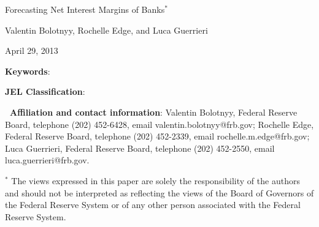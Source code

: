\documentclass[12pt]{article}
\renewcommand{\baselinestretch}{1.5}
\begin{document}
\bigskip

\bigskip

\clearpage

\renewcommand{\baselinestretch}{1.0}

\begin{center}
{\normalsize \thispagestyle{empty} }

{\normalsize \medskip }

{\normalsize {\Large Forecasting Net Interest Margins of Banks$^{*}$}
\medskip }

{\normalsize \bigskip \bigskip }

{\normalsize Valentin Bolotnyy, Rochelle Edge, and Luca Guerrieri }

{\normalsize \bigskip \bigskip }

{\normalsize April 29, 2013 }

{\normalsize \bigskip }
\end{center}

{\normalsize \bigskip }

\abstract{}

{\normalsize \vspace{3.0cm} }

{\normalsize \noindent \textbf{Keywords}: \vspace{1cm} }

{\normalsize \noindent \textbf{JEL Classification}: }

{\normalsize \vspace{2cm} }

\renewcommand{\baselinestretch}{1} {\footnotesize \noindent }

{\footnotesize \textbf{\ Affiliation and contact information}: Valentin
Bolotnyy, Federal Reserve Board, telephone (202) 452-6428, email
valentin.bolotnyy@frb.gov; Rochelle Edge, Federal Reserve Board, telephone
(202) 452-2339, email rochelle.m.edge@frb.gov; Luca Guerrieri, Federal
Reserve Board, telephone (202) 452-2550, email luca.guerrieri@frb.gov. }

{\footnotesize \vspace{2cm} }

{\footnotesize \noindent $^{*}$ The views expressed in this paper are solely
the responsibility of the authors and should not be interpreted as
reflecting the views of the Board of Governors of the Federal Reserve System
or of any other person associated with the Federal Reserve System. }

{\footnotesize \clearpage \renewcommand{\baselinestretch}{1.5} }
\end{document}
